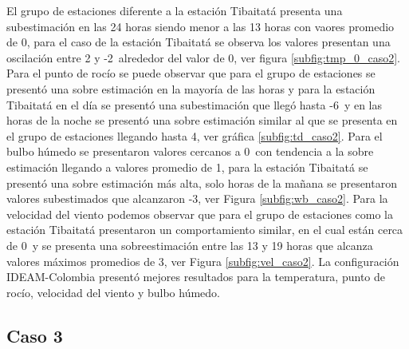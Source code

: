 El grupo de estaciones diferente a la estación Tibaitatá presenta una subestimación en las 24 horas siendo menor a las 13 horas con vaores promedio de 0\celc, para el caso de la estación Tibaitatá se observa los valores presentan una oscilación entre 2 y -2\celc\ alrededor del valor de 0\celc, ver figura \ref{subfig:tmp_0_caso2}. Para el punto de rocío se puede observar que para el grupo de estaciones se presentó una sobre estimación en la mayoría de las horas y para la estación Tibaitatá en el día se presentó una subestimación que llegó hasta -6\celc\ y en las horas de la noche se presentó una sobre estimación similar al que se presenta en el grupo de estaciones llegando hasta 4\celc, ver gráfica \ref{subfig:td_caso2}. Para el bulbo húmedo se presentaron valores cercanos a 0\celc\ con tendencia a la sobre estimación llegando a valores promedio de 1\celc, para la estación Tibaitatá se presentó una sobre estimación más alta, solo  horas de la mañana se presentaron valores subestimados que alcanzaron -3\celc, ver Figura \ref{subfig:wb_caso2}. Para la velocidad del viento podemos observar que para el grupo de estaciones como la estación Tibaitatá presentaron un comportamiento similar, en el cual están cerca de 0\celc\ y se presenta una sobreestimación entre las 13 y 19 horas que alcanza valores máximos promedios de 3\celc, ver Figura \ref{subfig:vel_caso2}. La configuración IDEAM-Colombia presentó mejores resultados para la temperatura, punto de rocío, velocidad del viento y bulbo húmedo.\\


\subsection{Caso 3}

